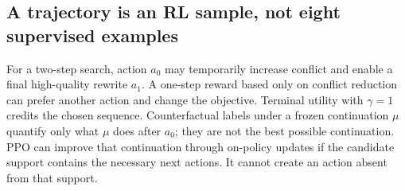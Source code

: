 \subsection{A trajectory is an RL sample, not eight supervised examples}
For a two-step search, action $a_0$ may temporarily increase conflict and enable a final high-quality rewrite $a_1$. A one-step reward based only on conflict reduction can prefer another action and change the objective. Terminal utility with $\gamma=1$ credits the chosen sequence. Counterfactual labels under a frozen continuation $\mu$ quantify only what $\mu$ does after $a_0$; they are not the best possible continuation. PPO can improve that continuation through on-policy updates if the candidate support contains the necessary next actions. It cannot create an action absent from that support.
